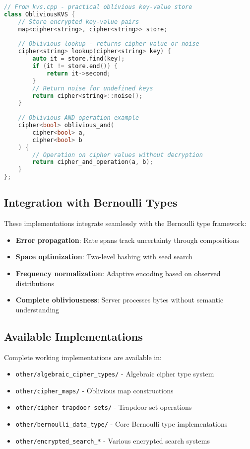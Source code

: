 \begin{lstlisting}[language=C++, caption={Oblivious KVS with cipher operations}]
// From kvs.cpp - practical oblivious key-value store
class ObliviousKVS {
    // Store encrypted key-value pairs
    map<cipher<string>, cipher<string>> store;
    
    // Oblivious lookup - returns cipher value or noise
    cipher<string> lookup(cipher<string> key) {
        auto it = store.find(key);
        if (it != store.end()) {
            return it->second;
        }
        // Return noise for undefined keys
        return cipher<string>::noise();
    }
    
    // Oblivious AND operation example
    cipher<bool> oblivious_and(
        cipher<bool> a, 
        cipher<bool> b
    ) {
        // Operation on cipher values without decryption
        return cipher_and_operation(a, b);
    }
};
\end{lstlisting}

\subsection{Integration with Bernoulli Types}

These implementations integrate seamlessly with the Bernoulli type framework:

\begin{itemize}
\item \textbf{Error propagation}: Rate spans track uncertainty through compositions
\item \textbf{Space optimization}: Two-level hashing with seed search
\item \textbf{Frequency normalization}: Adaptive encoding based on observed distributions
\item \textbf{Complete obliviousness}: Server processes bytes without semantic understanding
\end{itemize}

\subsection{Available Implementations}

Complete working implementations are available in:
\begin{itemize}
\item \texttt{other/algebraic\_cipher\_types/} - Algebraic cipher type system
\item \texttt{other/cipher\_maps/} - Oblivious map constructions
\item \texttt{other/cipher\_trapdoor\_sets/} - Trapdoor set operations
\item \texttt{other/bernoulli\_data\_type/} - Core Bernoulli type implementations
\item \texttt{other/encrypted\_search\_*} - Various encrypted search systems
\end{itemize}

